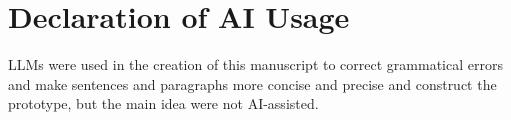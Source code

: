 \documentclass[journal]{IEEEtran}
\begin{document}
\ifCLASSOPTIONcaptionsoff
  \newpage
\fi





%
%
%


% 
\section*{Declaration of AI Usage}
LLMs were used in the creation of this manuscript to correct grammatical errors and make sentences and paragraphs more concise and precise and construct the prototype, but the main idea were not AI-assisted.
\end{document}
